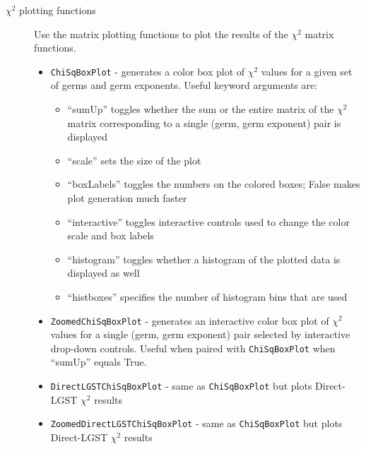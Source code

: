 \documentclass{article}[11pt]
\begin{document}
\begin{description}
\item[$\chi^2$ plotting functions] Use the matrix plotting functions to plot the results of the $\chi^2$ matrix functions.
  \begin{itemize}
    \item \texttt{ChiSqBoxPlot} - generates a color box plot of $\chi^2$ values for a given set of germs and germ exponents.  Useful keyword arguments are:
      \begin{itemize}
        \item ``sumUp'' toggles whether the sum or the entire matrix of the $\chi^2$ matrix corresponding to a single (germ, germ exponent) pair is displayed
        \item ``scale'' sets the size of the plot
        \item ``boxLabels'' toggles the numbers on the colored boxes; False makes plot generation much faster
        \item ``interactive'' toggles interactive controls used to change the color scale and box labels
        \item ``histogram'' toggles whether a histogram of the plotted data is displayed as well
        \item ``histboxes'' specifies the number of histogram bins that are used
      \end{itemize}
    \item \texttt{ZoomedChiSqBoxPlot}  - generates an interactive color box plot of $\chi^2$ values for a single (germ, germ exponent) pair selected by interactive drop-down controls.  Useful when paired with \texttt{ChiSqBoxPlot} when ``sumUp'' equals True.
    \item \texttt{DirectLGSTChiSqBoxPlot} - same as \texttt{ChiSqBoxPlot} but plots Direct-LGST $\chi^2$ results
    \item \texttt{ZoomedDirectLGSTChiSqBoxPlot} - same as \texttt{ChiSqBoxPlot} but plots Direct-LGST $\chi^2$ results
  \end{itemize}
\end{description}
\end{document}
